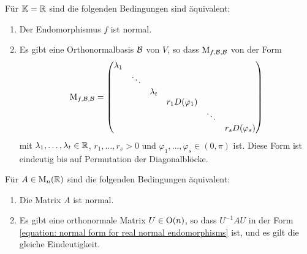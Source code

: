 \begin{theorem}
  Für $\mathbb{K} = \mathbb{R}$ sind die folgenden Bedingungen sind äquivalent:
  \begin{enumerate}
    \item
      Der Endomorphismus $f$ ist normal.
    \item
      Es gibt eine Orthonormalbasis $\mathcal{B}$ von $V$, so dass $\operatorname{M}_{f, \mathcal{B}, \mathcal{B}}$ von der Form
      \begin{equation}
      \label{equation: normal form for real normal endomorphisms}
          \operatorname{M}_{f, \mathcal{B}, \mathcal{B}}
        = \begin{pmatrix}
            \lambda_1 &         &           &                   &         &                   \\
                      & \ddots  &           &                   &         &                   \\
                      &         & \lambda_t &                   &         &                   \\
                      &         &           & r_1 D(\varphi_1)  &         &                   \\
                      &         &           &                   & \ddots  &                   \\
                      &         &           &                   &         & r_s D(\varphi_s)
          \end{pmatrix}
      \end{equation}
      mit $\lambda_1, \dotsc, \lambda_t \in \mathbb{R}$, $r_1, \dotsc, r_s > 0$ und $\varphi_1, \dotsc, \varphi_s \in (0, \pi)$ ist.
      Diese Form ist eindeutig bis auf Permutation der Diagonalblöcke.
  \end{enumerate}
\end{theorem}

\begin{corollary}
  Für $A \in \operatorname{M}_{n}(\mathbb{R})$ sind die folgenden Bedingungen äquivalent:
  \begin{enumerate}
    \item
      Die Matrix $A$ ist normal.
    \item
      Es gibt eine orthonormale Matrix $U \in \operatorname{O}(n)$, so dass $U^{-1} A U$ in der Form \eqref{equation: normal form for real normal endomorphisms} ist, und es gilt die gleiche Eindeutigkeit.
  \end{enumerate}
\end{corollary}





